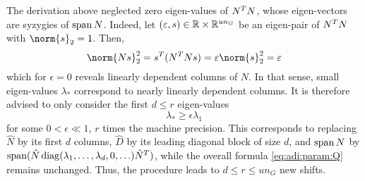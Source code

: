 The derivation above neglected zero eigen-values of $N^T N$,
whose eigen-vectors are syzygies of $\operatorname{span} N$.
Indeed, let $(\varepsilon,s)\in\mathbb{R}\times\mathbb{R}^{un_G}$ be an eigen-pair of $N^T N$ with $\norm{s}_2 = 1$.
Then,
\begin{equation}
  \norm{Ns}_2^2
  = s^\T (N^\T N s)
  = \epsilon\norm{s}_2^2
  = \epsilon
\end{equation}
which for $\epsilon=0$ reveals linearly dependent columns of $N$.
In that sense, small eigen-values $\lambda_*$ correspond to nearly linearly dependent columns.
It is therefore advised to only consider the first $d \leq r$ eigen-values
\begin{equation}
  \lambda_* \geq \epsilon \lambda_1
\end{equation}
for some $0 < \epsilon \ll 1$, \eg $r$ times the machine precision.
This corresponds to replacing
$\hat N$ by its first $d$ columns,
$\hat D$ by its leading diagonal block of size $d$,
and $\operatorname{span} N$ by $\operatorname{span}(\hat N \operatorname{diag}(\lambda_1, \ldots, \lambda_d, 0, \ldots) \hat N^T)$,
while the overall formula \eqref{eq:adi:param:Q} remains unchanged.
Thus, the procedure leads to $d \leq r \leq un_G$ new shifts.

